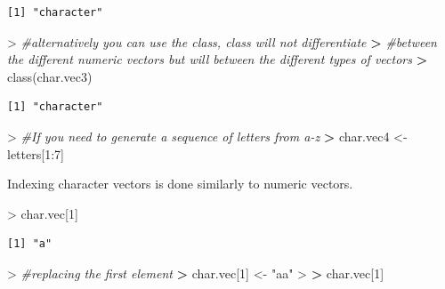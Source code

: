 \documentclass[
]{book}
\newenvironment{Shaded}{\begin{snugshade}}{\end{snugshade}}
\newcommand{\CommentTok}[1]{\textcolor[rgb]{0.56,0.35,0.01}{\textit{#1}}}
\newcommand{\DecValTok}[1]{\textcolor[rgb]{0.00,0.00,0.81}{#1}}
\newcommand{\ErrorTok}[1]{\textcolor[rgb]{0.64,0.00,0.00}{\textbf{#1}}}
\newcommand{\FunctionTok}[1]{\textcolor[rgb]{0.00,0.00,0.00}{#1}}
\newcommand{\NormalTok}[1]{#1}
\newcommand{\OtherTok}[1]{\textcolor[rgb]{0.56,0.35,0.01}{#1}}
\newcommand{\SpecialCharTok}[1]{\textcolor[rgb]{0.00,0.00,0.00}{#1}}
\newcommand{\StringTok}[1]{\textcolor[rgb]{0.31,0.60,0.02}{#1}}
\theoremstyle{definition}
\theoremstyle{definition}
\theoremstyle{definition}
\theoremstyle{definition}
\theoremstyle{remark}
\begin{document}
\begin{verbatim}
[1] "character"
\end{verbatim}

\begin{Shaded}
\begin{Highlighting}[]
\SpecialCharTok{\textgreater{}} \CommentTok{\#alternatively you can use the class, class will not differentiate }
\ErrorTok{\textgreater{}} \CommentTok{\#between the different numeric vectors but will between the different types of vectors}
\ErrorTok{\textgreater{}} \FunctionTok{class}\NormalTok{(char.vec3)}
\end{Highlighting}
\end{Shaded}

\begin{verbatim}
[1] "character"
\end{verbatim}

\begin{Shaded}
\begin{Highlighting}[]
\SpecialCharTok{\textgreater{}} \CommentTok{\#If you need to generate a sequence of letters from a{-}z}
\ErrorTok{\textgreater{}}\NormalTok{ char.vec4 }\OtherTok{\textless{}{-}}\NormalTok{ letters[}\DecValTok{1}\SpecialCharTok{:}\DecValTok{7}\NormalTok{]}
\end{Highlighting}
\end{Shaded}

Indexing character vectors is done similarly to numeric vectors.

\begin{Shaded}
\begin{Highlighting}[]
\SpecialCharTok{\textgreater{}}\NormalTok{ char.vec[}\DecValTok{1}\NormalTok{]}
\end{Highlighting}
\end{Shaded}

\begin{verbatim}
[1] "a"
\end{verbatim}

\begin{Shaded}
\begin{Highlighting}[]
\SpecialCharTok{\textgreater{}} \CommentTok{\#replacing the first element}
\ErrorTok{\textgreater{}}\NormalTok{ char.vec[}\DecValTok{1}\NormalTok{] }\OtherTok{\textless{}{-}} \StringTok{"aa"}
\SpecialCharTok{\textgreater{}} 
\ErrorTok{\textgreater{}}\NormalTok{ char.vec[}\DecValTok{1}\NormalTok{]}
\end{Highlighting}
\end{Shaded}
\end{document}
